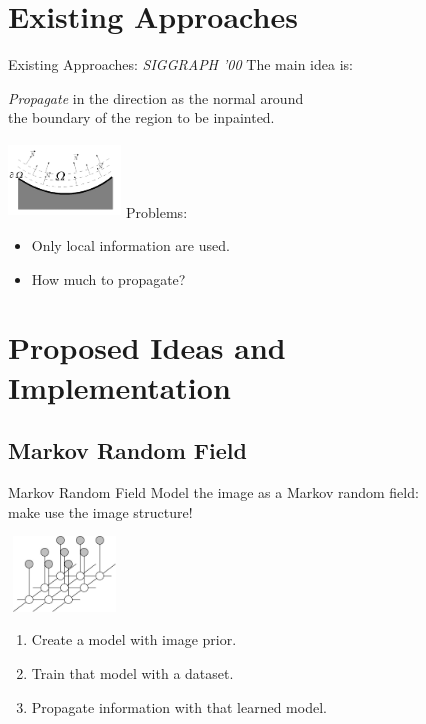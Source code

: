 \documentclass{beamer}
\begin{document}
\section{Existing Approaches}
\begin{frame}{Existing Approaches: \emph{SIGGRAPH '00}}
The main idea is:
\begin{center}
\hspace*{-2cm}
\emph{Propagate} in the direction as the normal around \\\hspace*{-2cm}the boundary of the region to be inpainted.
\end{center}
\vspace*{-2cm}
\hspace*{8.5cm}
\includegraphics[height=2cm, width=3cm]{prop.png}
\pause
\vspace*{1cm}
Problems:
\begin{itemize}
\item Only local information are used.
\item How much to propagate?
\end{itemize}

\end{frame}



\section{Proposed Ideas and Implementation}
\subsection{Markov Random Field}
\begin{frame}{Markov Random Field}
Model the image as a Markov random field:\\
\quad make use the image structure!


\hspace*{8cm}
\includegraphics[height=2cm, width=3cm]{mrf.jpg}

\vspace*{-1cm}
\begin{enumerate}
\item Create a model with image prior.
\item Train that model with a dataset.
\item Propagate information with that learned model.
\end{enumerate}
\end{frame}
\end{document}
